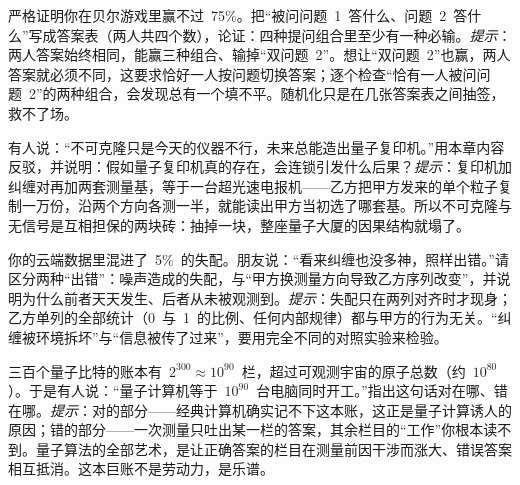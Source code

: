 \begin{puzzles}
\item 严格证明你在贝尔游戏里赢不过~75\%。把“被问问题~1~答什么、问题~2~答什么”写成答案表（两人共四个数），论证：四种提问组合里至少有一种必输。\emph{提示}：两人答案始终相同，能赢三种组合、输掉“双问题~2”。想让“双问题~2”也赢，两人答案就必须不同，这要求恰好一人按问题切换答案；逐个检查“恰有一人被问问题~2”的两种组合，会发现总有一个填不平。随机化只是在几张答案表之间抽签，救不了场。
\item 有人说：“不可克隆只是今天的仪器不行，未来总能造出量子复印机。”用本章内容反驳，并说明：假如量子复印机真的存在，会连锁引发什么后果？\emph{提示}：复印机加纠缠对再加两套测量基，等于一台超光速电报机——乙方把甲方发来的单个粒子复制一万份，沿两个方向各测一半，就能读出甲方当初选了哪套基。所以不可克隆与无信号是互相担保的两块砖：抽掉一块，整座量子大厦的因果结构就塌了。
\item 你的云端数据里混进了~5\%~的失配。朋友说：“看来纠缠也没多神，照样出错。”请区分两种“出错”：噪声造成的失配，与“甲方换测量方向导致乙方序列改变”，并说明为什么前者天天发生、后者从未被观测到。\emph{提示}：失配只在两列对齐时才现身；乙方单列的全部统计（0~与~1~的比例、任何内部规律）都与甲方的行为无关。“纠缠被环境拆坏”与“信息被传了过来”，要用完全不同的对照实验来检验。
\item 三百个量子比特的账本有~\(2^{300}\approx10^{90}\)~栏，超过可观测宇宙的原子总数（约~\(10^{80}\)）。于是有人说：“量子计算机等于~\(10^{90}\)~台电脑同时开工。”指出这句话对在哪、错在哪。\emph{提示}：对的部分——经典计算机确实记不下这本账，这正是量子计算诱人的原因；错的部分——一次测量只吐出某一栏的答案，其余栏目的“工作”你根本读不到。量子算法的全部艺术，是让正确答案的栏目在测量前因干涉而涨大、错误答案相互抵消。这本巨账不是劳动力，是乐谱。
\end{puzzles}
